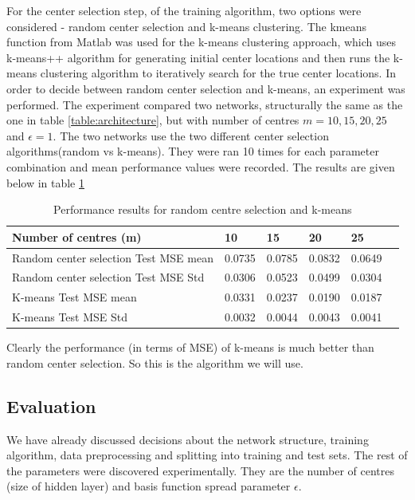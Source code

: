 \documentclass[a4paper, 11pt]{article}
\begin{document}
For the center selection step, of the training algorithm, two options were considered - random center selection and k-means clustering. The kmeans function from Matlab was used for the k-means clustering approach, which uses k-means++ algorithm \cite{Arthur2007} for generating initial center locations and then runs the k-means clustering algorithm \cite{Lloyd82} to iteratively search for the true center locations. In order to decide between random center selection and k-means, an experiment was performed.  The experiment compared two networks, structurally the same as the one in table \ref{table:architecture}, but with number of centres $m = 10, 15, 20, 25$ and $\epsilon = 1$. The two networks use the two different center selection algorithms(random vs k-means). They were ran 10 times for each parameter combination and mean performance values were recorded. The results are given below in table \ref{table:centermse}

\begin{table}[h]
\centering
\begin{tabular}{| l | l | l | l | l | l |}
\hline
Number of centres (m) & 10 & 15 & 20 & 25 \\
\hline
Random center selection Test MSE mean & 0.0735 & 0.0785 & 0.0832 & 0.0649 \\
\hline
Random center selection Test MSE Std & 0.0306 & 0.0523 & 0.0499 & 0.0304 \\
\hline
K-means Test MSE mean & 0.0331 & 0.0237 & 0.0190 & 0.0187 \\
\hline
K-means Test MSE Std & 0.0032 & 0.0044 & 0.0043 & 0.0041 \\
\hline
\end{tabular}
\caption{Performance results for random centre selection and k-means}
\label{table:centermse}
\end{table}


Clearly the performance (in terms of MSE) of k-means is much better than random center selection. So this is the algorithm we will use.

\subsection{Evaluation}
We have already discussed decisions about the network structure, training algorithm, data preprocessing and splitting into training and test sets. The rest of the parameters were discovered experimentally. They are the number of centres (size of hidden layer) and basis function spread parameter $\epsilon$.
\end{document}
